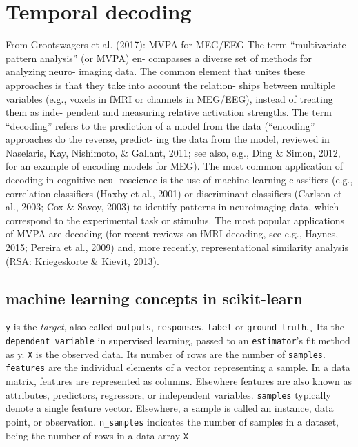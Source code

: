 \pagebreak

\section{Temporal decoding}

From Grootswagers et al. (2017): MVPA for MEG/EEG
The term “multivariate pattern analysis” (or MVPA) en-
compasses a diverse set of methods for analyzing neuro-
imaging data. The common element that unites these
approaches is that they take into account the relation-
ships between multiple variables (e.g., voxels in fMRI or
channels in MEG/EEG), instead of treating them as inde-
pendent and measuring relative activation strengths. The
term “decoding” refers to the prediction of a model from
the data (“encoding” approaches do the reverse, predict-
ing the data from the model, reviewed in Naselaris, Kay,
Nishimoto, \& Gallant, 2011; see also, e.g., Ding \& Simon,
2012, for an example of encoding models for MEG). The
most common application of decoding in cognitive neu-
roscience is the use of machine learning classifiers (e.g.,
correlation classifiers (Haxby et al., 2001) or discriminant
classifiers (Carlson et al., 2003; Cox \& Savoy, 2003) to
identify patterns in neuroimaging data, which correspond
to the experimental task or stimulus. The most popular
applications of MVPA are decoding (for recent reviews on
fMRI decoding, see e.g., Haynes, 2015; Pereira et al., 2009)
and, more recently, representational similarity analysis
(RSA: Kriegeskorte \& Kievit, 2013).

\subsection{machine learning concepts in scikit-learn}

\texttt{y} is the \textit{target}, also called \texttt{outputs}, \texttt{responses}, \texttt{label} or \texttt{ground truth}.¸ Its the \texttt{dependent variable} in supervised learning, passed to an \texttt{estimator}'s fit method as y.
\texttt{X} is the observed data. Its number of rows are the number of \texttt{samples}.
\texttt{features} are the individual elements of a vector representing a sample. In a data matrix, features are represented as columns. Elsewhere features are also known as attributes, predictors, regressors, or independent variables.
\texttt{samples} typically denote a single feature vector. Elsewhere, a sample is called an instance, data point, or observation. \texttt{n\_samples} indicates the number of samples in a dataset, being the number of rows in a data array \texttt{X}



